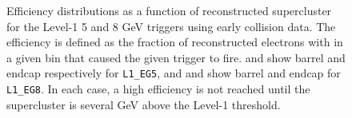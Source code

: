 \begin{figure}[htb]
  \caption[\fixspacing Efficiency as a function of
  reconstructed supercluster \Et for Level-1 triggers]
  {\fixspacing Efficiency distributions as a function of
  reconstructed supercluster \Et for the Level-1 5 and 8 GeV triggers
  using early collision data.
  The efficiency is defined as the fraction of reconstructed electrons
  with \Et in a given bin that caused the given trigger to fire.
   and  show barrel and endcap respectively for 
  \texttt{L1\_EG5}, 
  and  and  show barrel and endcap for
  \texttt{L1\_EG8}. 
  In each case, a high efficiency is not reached until
  the supercluster \Et is several GeV above the Level-1 threshold.
  }
  \label{fig:L1Effs}
 \end{figure}










